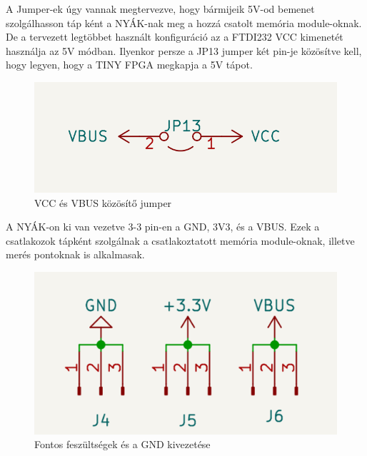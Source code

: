 \documentclass[a4paper,12pt,oneside]{book}
\begin{document}
A Jumper-ek úgy vannak megtervezve, hogy bármijeik 5V-od bemenet szolgálhasson táp ként a NYÁK-nak meg a hozzá csatolt memória module-oknak. De a tervezett legtöbbet használt konfiguráció az a FTDI232 VCC kimenetét használja az 5V módban. Ilyenkor persze a JP13 jumper két pin-je közösítve kell, hogy legyen, hogy a TINY FPGA megkapja a 5V tápot.
\begin{figure}[H]
	\centering
	\includegraphics[trim=1mm 1mm 1mm 1mm,scale=0.45]{JP13.PNG}
	\caption{VCC és VBUS közösítő jumper}
	\label{VCC és VBUS közösítő jumper}
\end{figure}
A NYÁK-on ki van vezetve 3-3 pin-en a GND, 3V3, és a VBUS. Ezek a csatlakozok tápként szolgálnak a csatlakoztatott memória module-oknak, illetve merés pontoknak is alkalmasak.
\begin{figure}[H]
	\centering
	\includegraphics[trim=1mm 1mm 1mm 1mm,scale=0.45]{gnd5v3v3.PNG}
	\caption{Fontos feszültségek és a GND kivezetése}
	\label{Fontos feszültségek és a GND kivezetése}
\end{figure}
\end{document}
